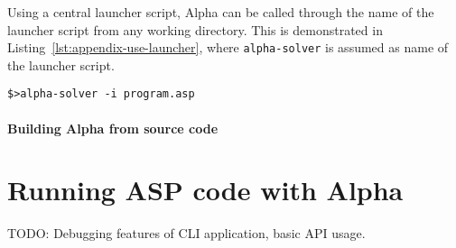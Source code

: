 Using a central launcher script, Alpha can be called through the name of the launcher script from any working directory. This is demonstrated in Listing~\ref{lst:appendix-use-launcher}, where \texttt{alpha-solver} is assumed as name of the launcher script.
\begin{lstlisting}[style=code, label={lst:appendix-use-launcher}, caption={Solving an ASP program using Alpha through a launcher script.}]
$>alpha-solver -i program.asp
\end{lstlisting}

\paragraph{Building Alpha from source code}

\section{Running ASP code with Alpha}

TODO: Debugging features of CLI application, basic API usage.

